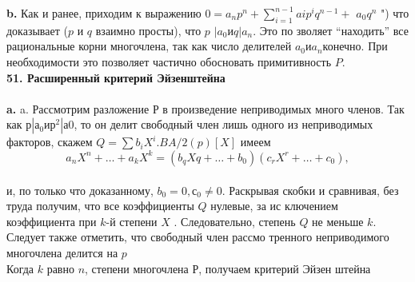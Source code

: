 \documentclass{../../template/mai_book}
\begin{document}
{{\hspace*{15pt}\textbf{b.} Как и ранее, приходим к выражению $0 = a_{n}p^{n} + \sum^{n-1}_{i=1}a{i}p^{i}q^{n-1}+$\linebreak
$a_{0}q^n$ ") что доказывает ($p$ и $q$ взаимно просты), что $p$ $| a_0 и q | a_n$. Это по­\linebreak
зволяет “находить” все рациональные корни многочлена, так как число\linebreak
делителей $a_0 и a_n $конечно. При необходимости это позволяет частично\linebreak
обосновать примитивность $P$.\\
\newpage
\noindent\textbf{51. Расширенный критерий Эйзенштейна}\\
\\
\hspace*{15pt}\textbf{a.} a. Рассмотрим разложение $Р$ в произведение неприводимых много­\linebreak
членов. Так как $р | а_0 и р^{2} |а0$, то он делит свободный член лишь одного\linebreak
из неприводимых факторов, скажем  $Q = \sum b_{i}X^{i}. B A/2(p)[X]$ имеем
$$a_{n}X^{n}+\ldots+a_{k}X^{k} = (b_{q}X{q}+\ldots+b_0)(c_{r}X^{r}+\ldots+c_0),$$
\\
\noindent и, по только что доказанному, $b_0 = 0, с_0 \neq 0.$ Раскрывая скобки и\linebreak
сравнивая, без труда получим, что все коэффициенты $Q$ нулевые, за ис­\linebreak
ключением коэффициента при $k$-й степени $X$ . Следовательно, степень\linebreak
$Q$ не меньше $k$. Следует также отметить, что свободный член рассмо­\linebreak
тренного неприводимого многочлена делится на $p$\\

\hspace*{0pt} Когда $k$ равно $n$, степени многочлена $Р$, получаем критерий Эйзен­\linebreak
штейна\\

}}
\end{document}
